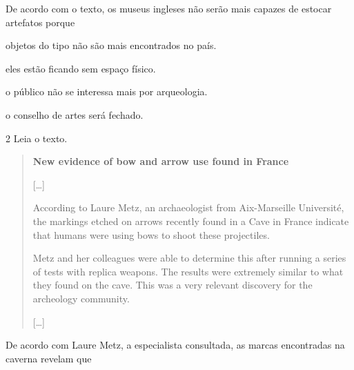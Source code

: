 De acordo com o texto, os museus ingleses não serão mais capazes de
estocar artefatos porque

\begin{escolha}
\item objetos do tipo não são mais encontrados no país.

\item eles estão ficando sem espaço físico.

\item o público não se interessa mais por arqueologia.

\item o conselho de artes será fechado.
\end{escolha}


\num{2} Leia o texto.

\begin{quote}
\textbf{New evidence of bow and arrow use found in France}

{[}\ldots{}{]}

According to Laure Metz, an archaeologist from Aix-Marseille Université, the markings etched on arrows recently found in a Cave in France indicate that humans were using bows to shoot these projectiles.

Metz and her colleagues were able to determine this after running a series of tests with replica weapons. The results were extremely similar to what they found on the cave. This was a very relevant discovery for the archeology community.   

{[}\ldots{}{]}

\end{quote}

De acordo com Laure Metz, a especialista consultada, as marcas encontradas na caverna revelam que

